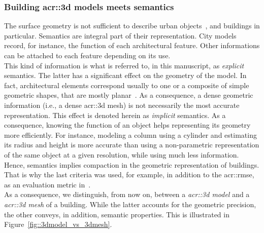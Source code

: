         \subsubsection{Building \texorpdfstring{\gls*{acr::3d}}{3D} models meets semantics}
            \label{subsubsec::introduction::urban_3d_reconstruction::building_3d_modeling::semantics}
            The surface geometry is not sufficient to describe urban objects~\parencite{biljecki2016improved}, and buildings in particular.
            Semantics are integral part of their representation.
            City models record, for instance, the function of each architectural feature.
            Other informations can be attached to each feature depending on its use.\\
            This kind of information is what is referred to, in this manuscript, as \textit{explicit} semantics.
            The latter has a significant effect on the geometry of the model.
            In fact, architectural elements correspond usually to one or a composite of simple geometric shapes, that are mostly planar~\parencite{kolbe2005citygml}.
            As a consequence, a dense geometric information (i.e., a dense \gls{acr::3d} mesh) is not necessarily the most accurate representation.
            This effect is denoted herein as \textit{implicit} semantics.
            As a consequence, knowing the function of an object helps representing its geometry more efficiently.
            For instance, modeling a column using a cylinder and estimating its radius and height is more accurate than using a non-parametric representation of the same object at a given resolution, while using much less information.
            Hence, semantics implies compaction in the geometric representation of buildings.
            That is why the last criteria was used, for example, in addition to the \gls{acr::rmse}, as an evaluation metric in~\textcite{lafarge2012creating}.\\
            As a consequence, we distinguish, from now on, between a \textit{\gls{acr::3d} model} and a \textit{\gls{acr::3d} mesh} of a building.
            While the latter accounts for the geometric precision, the other conveys, in addition, semantic properties.
            This is illustrated in Figure~\ref{fig::3dmodel_vs_3dmesh}.\\

